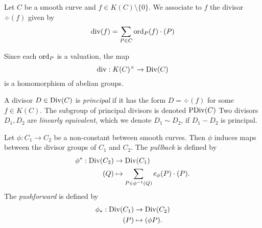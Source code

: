 \begin{definition}
	Let $C$ be a smooth curve and $f \in K(C)\setminus\{0\}$. We
	associate to $f$ the divisor $\div(f)$ given by
	\begin{equation*}
		\operatorname{div}(f) = \sum_{P \in C}\operatorname{ord}_P(f)\cdot(P)
	\end{equation*}
\end{definition}

\begin{remark}
	Since each $\operatorname{ord}_P$ is a valuation, the map
	\begin{equation*}
		\operatorname{div}: K(C)^\times \to \operatorname{Div}(C)
	\end{equation*}
	is a homomorphism of abelian groups.
\end{remark}

\begin{definition}
	A divisor $D \in \operatorname{Div}(C)$ is \emph{principal} if it has the form
	$D = \div(f)$ for some $f \in K(C)$. The subgroup of principal divisors
	is denoted $\operatorname{PDiv}(C)$
	Two divisors $D_1, D_2$ are \emph{linearly equivalent}, which we denote
	$D_1 \sim D_2$, if $D_1 - D_2$ is principal.
\end{definition}


\begin{definition}
	Let $\phi: C_1 \to C_2$ be a non-constant between smooth curves.
	Then $\phi$ induces maps between the divisor groups of $C_1$ and $C_2$.
	The \emph{pullback} is defined by
	\begin{align*}
		\phi^*: \operatorname{Div}(C_2) &\to \operatorname{Div}(C_1)\\
		(Q) &\mapsto \sum_{P \in \phi^{-1}(Q)}e_\phi(P)\cdot(P).
	\end{align*}
	The \emph{pushforward} is defined by
	\begin{align*}
		\phi_*: \operatorname{Div}(C_1) &\to \operatorname{Div}(C_2)\\
		(P) &\mapsto (\phi P).
	\end{align*}
\end{definition}

